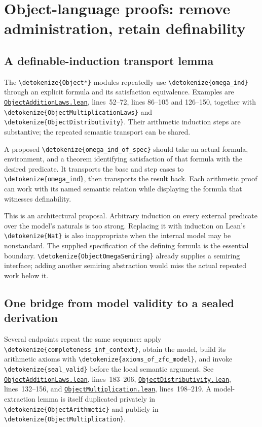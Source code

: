\documentclass[11pt,letterpaper]{article}
\newcommand{\code}[1]{\expandafter\nolinkurl\expandafter{\detokenize{#1}}}
\newcommand{\repo}{https://github.com/VladimirReshetnikov/ProveIt/blob/60e9c5d620c6c387d932876cfa2d9376f64ea56c}
\newcommand{\src}[2]{\href{\repo/Computability/DiophantineConsistency/Lean/DiophantineConsistency/#1.lean}{\nolinkurl{#1.lean}}, lines~#2}
\begin{document}
\section{Object-language proofs: remove administration, retain definability}

\subsection{A definable-induction transport lemma}

The \code{Object*} modules repeatedly use \code{omega_ind} through an explicit formula and its satisfaction equivalence. Examples are \src{ObjectAdditionLaws}{52--72}, lines 86--105 and 126--150, together with \code{ObjectMultiplicationLaws} and \code{ObjectDistributivity}. Their arithmetic induction steps are substantive; the repeated semantic transport can be shared.

A proposed \code{omega_ind_of_spec} should take an actual formula, environment, and a theorem identifying satisfaction of that formula with the desired predicate. It transports the base and step cases to \code{omega_ind}, then transports the result back. Each arithmetic proof can work with its named semantic relation while displaying the formula that witnesses definability.

This is an architectural proposal. Arbitrary induction on every external predicate over the model's naturals is too strong. Replacing it with induction on Lean's \code{Nat} is also inappropriate when the internal model may be nonstandard. The supplied specification of the defining formula is the essential boundary. \code{ObjectOmegaSemiring} already supplies a semiring interface; adding another semiring abstraction would miss the actual repeated work below it.

\subsection{One bridge from model validity to a sealed derivation}

Several endpoints repeat the same sequence: apply \code{completeness_inf_context}, obtain the model, build its arithmetic axioms with \code{axioms_of_zfc_model}, and invoke \code{seal_valid} before the local semantic argument. See \src{ObjectAdditionLaws}{183--206}, \src{ObjectDistributivity}{132--156}, and \src{ObjectMultiplication}{198--219}. A model-extraction lemma is itself duplicated privately in \code{ObjectArithmetic} and publicly in \code{ObjectMultiplication}.
\end{document}
